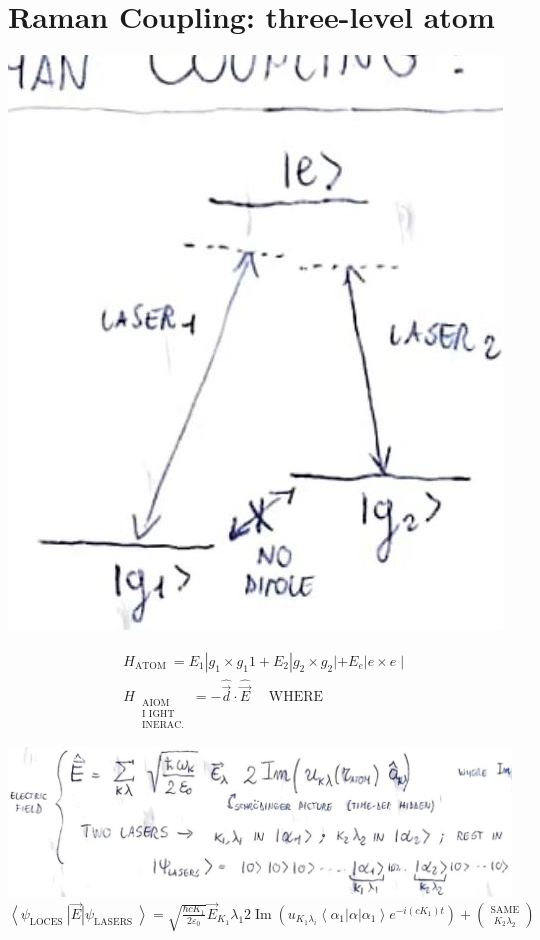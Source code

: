 \documentclass[10pt]{article}
\begin{document}
\section*{Raman Coupling: three-level atom}
\begin{center}
\includegraphics[max width=\textwidth]{2025_10_16_1968b45f52c890c3dc16g-1}
\end{center}

$$
\begin{aligned}
& H_{\text {ATOM }}=E_{1}\left|g_{1} \times g_{1} 1+E_{2}\right| g_{2} \times g_{2}\left|+E_{e}\right| e \times e \mid \\
& H_{\substack{\text { AIOM } \\
\text { I IGHT } \\
\text { INERAC. }}}=-\hat{\vec{d}} \cdot \hat{\vec{E}} \quad \text { WHERE }
\end{aligned}
$$

\includegraphics[max width=\textwidth, center]{2025_10_16_1968b45f52c890c3dc16g-1(1)}\\
$\left\langle\psi_{\text {LOCES }}\right| \vec{E}\left|\psi_{\text {LASERS }}\right\rangle=\sqrt{\frac{\hbar c K_{1}}{2 \varepsilon_{0}}} \vec{E}_{K_{1}} \lambda_{1} 2 \operatorname{Im}\left(u_{K_{1} \lambda_{i}}\left\langle\alpha_{1}\right| \alpha\left|\alpha_{1}\right\rangle e^{-i\left(c K_{1}\right) t}\right)+\binom{\text { SAME }}{K_{2} \lambda_{2}}$
\end{document}
